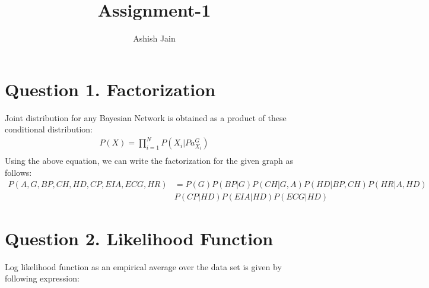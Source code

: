 \documentclass[11pt]{article} %
\title{Assignment-1}
\author{Ashish Jain}
\begin{document}
\maketitle

\section*{Question 1. Factorization}
{\raggedleft{}Joint distribution for any Bayesian Network is obtained as a product of these conditional distribution:}
\begin{align*}
P(X) = \prod_{i=1}^{N} P(X_i | Pa_{X_i}^{G}) \\
\end{align*}
Using the above equation, we can write the factorization for the given graph as follows:
\begin{align*}
P(A,G,BP,CH,HD,CP,EIA,ECG,HR) &= P(G)P(BP|G)P(CH|G, A)P(HD|BP, CH)P(HR|A, HD)\\
								&P(CP|HD)P(EIA|HD)P(ECG|HD)
\end{align*}
\section*{Question 2. Likelihood Function}

Log likelihood function as an empirical average over the data set is given by following expression:
\end{document}
